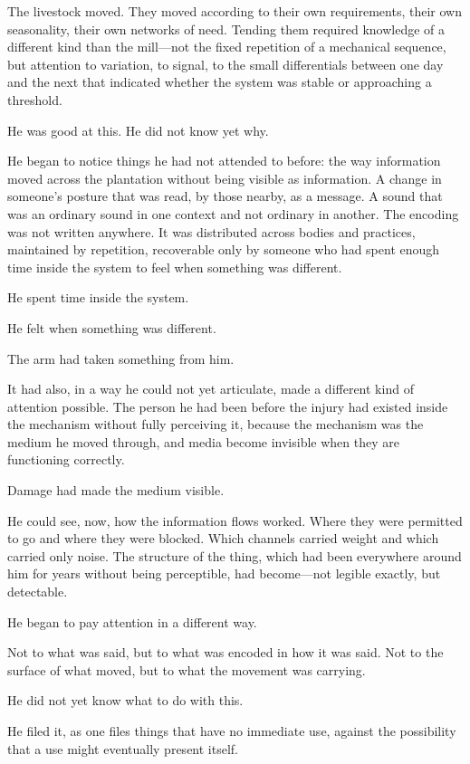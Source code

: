 The livestock moved. They moved according to their own
requirements, their own seasonality, their own networks of
need. Tending them required knowledge of a different kind
than the mill---not the fixed repetition of a mechanical
sequence, but attention to variation, to signal, to the small
differentials between one day and the next that indicated
whether the system was stable or approaching a threshold.

He was good at this. He did not know yet why.

He began to notice things he had not attended to before:
the way information moved across the plantation without being
visible as information. A change in someone's posture that was
read, by those nearby, as a message. A sound that was an
ordinary sound in one context and not ordinary in another.
The encoding was not written anywhere. It was distributed
across bodies and practices, maintained by repetition,
recoverable only by someone who had spent enough time inside
the system to feel when something was different.

He spent time inside the system.

He felt when something was different.

\scenebreak

The arm had taken something from him.

It had also, in a way he could not yet articulate, made a
different kind of attention possible. The person he had been
before the injury had existed inside the mechanism without
fully perceiving it, because the mechanism was the medium he
moved through, and media become invisible when they are
functioning correctly.

Damage had made the medium visible.

He could see, now, how the information flows worked. Where
they were permitted to go and where they were blocked. Which
channels carried weight and which carried only noise. The
structure of the thing, which had been everywhere around him
for years without being perceptible, had become---not legible
exactly, but detectable.

He began to pay attention in a different way.

Not to what was said, but to what was encoded in how it was
said. Not to the surface of what moved, but to what the
movement was carrying.

He did not yet know what to do with this.

He filed it, as one files things that have no immediate use,
against the possibility that a use might eventually present
itself.
